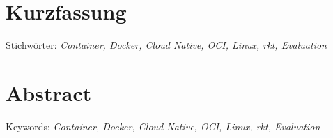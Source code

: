 
\chapter{Kurzfassung}
\thispagestyle{front}
\label{chap:kurzfassung}

Stichwörter: \textit{Container, Docker, Cloud Native, OCI, Linux, rkt, Evaluation}
\begingroup
\let\cleardoublepage\relax
\chapter{Abstract}
\thispagestyle{front}
\label{chap:Abstract}

Keywords: \textit{Container, Docker, Cloud Native, OCI, Linux, rkt, Evaluation}
\endgroup